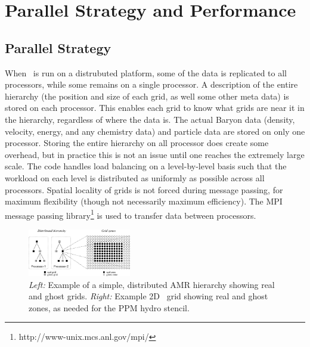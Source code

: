 \section{Parallel Strategy and Performance}

\subsection{Parallel Strategy}


When \enzo\ is run on a distrubuted platform, some of the data is
replicated to all processors, while some remains on a single processor.
A description of the entire hierarchy (the position and size of each grid, as well
some other meta data) is stored on each processor.  This enables each
grid to know what grids are near it in the hierarchy, regardless of
where the data is.  The actual Baryon data (density, velocity, energy,
and any chemistry data) and particle data are stored on only one
processor.  Storing the entire hierarchy on all processor does create
some overhead, but in practice this is not an issue until one reaches
the extremely large scale.
  The code handles load balancing 
on a level-by-level basis such that the workload on each level is 
distributed as uniformly as possible across all processors.  Spatial locality of 
grids is not forced during message passing, for maximum flexibility (though not
necessarily maximum efficiency).  
The MPI message passing library\footnote{http://www-unix.mcs.anl.gov/mpi/}
 is used to transfer data between processors.
 
 





\begin{figure}
\begin{center}
\includegraphics[width=0.4\textwidth]{figures/amr_hierarchy.eps}
\end{center}
\caption{\emph{Left:}  Example of a simple, distributed AMR hierarchy showing real and ghost grids.
\emph{Right:}  Example 2D \enzo\ grid showing real and ghost zones, as 
needed for the PPM hydro stencil. }
\label{fig:amr_hierarchy}
\end{figure}



